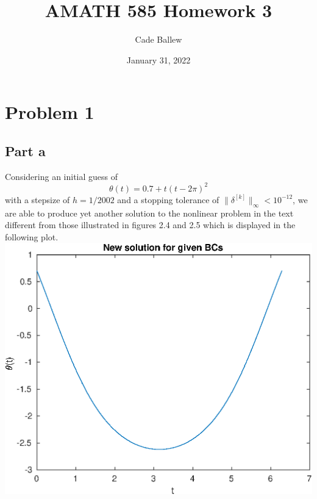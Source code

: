 \documentclass{article}
\title{AMATH 585 Homework 3}
\author{Cade Ballew}
\date{January 31, 2022}
\begin{document}
	
	\maketitle
	
	\section{Problem 1}
	\subsection{Part a}
Considering an initial guess of
\[
\theta(t)=0.7+t(t-2\pi)^2
\]
with a stepsize of $h=1/2002$ and a stopping tolerance of $\|\delta^{[k]}\|_\infty<10^{-12}$, we are able to produce yet another solution to the nonlinear problem in the text different from those illustrated in figures 2.4 and 2.5 which is displayed in the following plot. \\
	\includegraphics[scale=0.8]{hw3p1a.eps}\\
\end{document}
